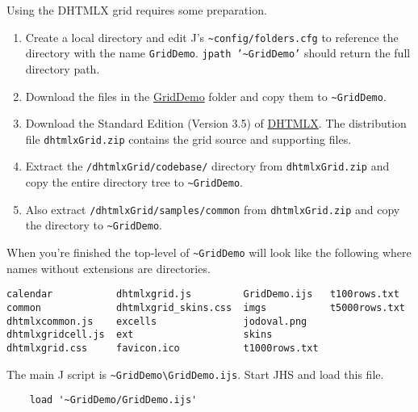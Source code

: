 Using the DHTMLX grid requires some preparation.

\begin{enumerate}
\item
  Create a local directory and edit J's
  \texttt{\textasciitilde{}config/folders.cfg} to reference the
  directory with the name \texttt{GridDemo}.
  \texttt{jpath '\textasciitilde{}GridDemo'} should return the full
  directory path.
\item
  Download the files in the
  \href{https://www.box.com/s/n7ty82nv6nslia4drphs}{GridDemo} folder and
  copy them to \texttt{\textasciitilde{}GridDemo}.
\item
  Download the Standard Edition (Version 3.5) of
  \href{http://dhtmlx.com/docs/products/dhtmlxGrid/index.shtml}{DHTMLX}.
  The distribution file \texttt{dhtmlxGrid.zip} contains the grid source
  and supporting files.
\item
  Extract the \texttt{/dhtmlxGrid/codebase/} directory from
  \texttt{dhtmlxGrid.zip} and copy the entire directory tree to
  \texttt{\textasciitilde{}GridDemo}.
\item
  Also extract \texttt{/dhtmlxGrid/samples/common} from
  \texttt{dhtmlxGrid.zip} and copy the directory to
  \texttt{\textasciitilde{}GridDemo}.
\end{enumerate}

When you're finished the top-level of \texttt{\textasciitilde{}GridDemo}
will look like the following where names without extensions are
directories.

\begin{tcolorbox}[breakable, size=fbox, boxrule=1pt, pad at break*=1mm,colback=cellbackground, colframe=cellborder]
\begin{verbatim}
calendar           dhtmlxgrid.js         GridDemo.ijs   t100rows.txt
common             dhtmlxgrid_skins.css  imgs           t5000rows.txt
dhtmlxcommon.js    excells               jodoval.png
dhtmlxgridcell.js  ext                   skins
dhtmlxgrid.css     favicon.ico           t1000rows.txt
\end{verbatim}
\end{tcolorbox}

\noindent The main J script is
\texttt{\textasciitilde{}GridDemo\textbackslash{}GridDemo.ijs}. Start
JHS and load this file.

\begin{tcolorbox}[breakable, size=fbox, boxrule=1pt, pad at break*=1mm,colback=cellbackground, colframe=cellborder]
\begin{verbatim}
    load '~GridDemo/GridDemo.ijs'
\end{verbatim}
\end{tcolorbox}

